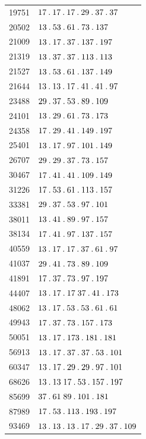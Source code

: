 \begin{longtable}{@{}r|l@{}}
19751 & $17\mathbin{.} 17\mathbin{.} 17\mathbin{.} 29\mathbin{.} 37\mathbin{.} 37$\\
20502 & $13\mathbin{.} 53\mathbin{.} 61\mathbin{.} 73\mathbin{.} 137$\\
21009 & $13\mathbin{.} 17\mathbin{.} 37\mathbin{.} 137\mathbin{.} 197$\\
21319 & $13\mathbin{.} 37\mathbin{.} 37\mathbin{.} 113\mathbin{.} 113$\\
21527 & $13\mathbin{.} 53\mathbin{.} 61\mathbin{.} 137\mathbin{.} 149$\\
21644 & $13\mathbin{.} 13\mathbin{.} 17\mathbin{.} 41\mathbin{.} 41\mathbin{.} 97$\\
23488 & $29\mathbin{.} 37\mathbin{.} 53\mathbin{.} 89\mathbin{.} 109$\\
24101 & $13\mathbin{.} 29\mathbin{.} 61\mathbin{.} 73\mathbin{.} 173$\\
24358 & $17\mathbin{.} 29\mathbin{.} 41\mathbin{.} 149\mathbin{.} 197$\\
25401 & $13\mathbin{.} 17\mathbin{.} 97\mathbin{.} 101\mathbin{.} 149$\\
26707 & $29\mathbin{.} 29\mathbin{.} 37\mathbin{.} 73\mathbin{.} 157$\\
30467 & $17\mathbin{.} 41\mathbin{.} 41\mathbin{.} 109\mathbin{.} 149$\\
31226 & $17\mathbin{.} 53\mathbin{.} 61\mathbin{.} 113\mathbin{.} 157$\\
33381 & $29\mathbin{.} 37\mathbin{.} 53\mathbin{.} 97\mathbin{.} 101$\\
38011 & $13\mathbin{.} 41\mathbin{.} 89\mathbin{.} 97\mathbin{.} 157$\\
38134 & $17\mathbin{.} 41\mathbin{.} 97\mathbin{.} 137\mathbin{.} 157$\\
40559 & $13\mathbin{.} 17\mathbin{.} 17\mathbin{.} 37\mathbin{.} 61\mathbin{.} 97$\\
41037 & $29\mathbin{.} 41\mathbin{.} 73\mathbin{.} 89\mathbin{.} 109$\\
41891 & $17\mathbin{.} 37\mathbin{.} 73\mathbin{.} 97\mathbin{.} 197$\\
44407 & $13\mathbin{.} 17\mathbin{.} 17\;37\mathbin{.} 41\mathbin{.} 173$\\
48062 & $13\mathbin{.} 17\mathbin{.} 53\mathbin{.} 53\mathbin{.} 61\mathbin{.} 61$\\
49943 & $17\mathbin{.} 37\mathbin{.} 73\mathbin{.} 157\mathbin{.} 173$\\
50051 & $13\mathbin{.} 17\mathbin{.} 173\mathbin{.} 181\mathbin{.} 181$\\
56913 & $13\mathbin{.} 17\mathbin{.} 37\mathbin{.} 37\mathbin{.} 53\mathbin{.} 101$\\
60347 & $13\mathbin{.} 17\mathbin{.} 29\mathbin{.} 29\mathbin{.} 97\mathbin{.} 101$\\
68626 & $13\mathbin{.} 13\;17\mathbin{.} 53\mathbin{.} 157\mathbin{.} 197$\\
85699 & $37\mathbin{.} 61\;89\mathbin{.} 101\mathbin{.} 181$\\
87989 & $17\mathbin{.} 53\mathbin{.} 113\mathbin{.} 193\mathbin{.} 197$\\
93469 & $13\mathbin{.} 13\mathbin{.} 13\mathbin{.} 17\mathbin{.} 29\mathbin{.} 37\mathbin{.} 109$\\

\end{longtable}
